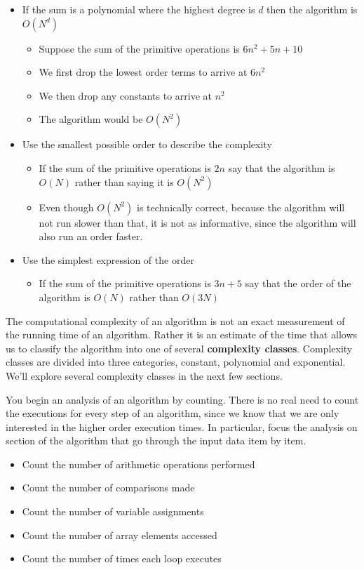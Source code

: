 \begin{itemize}
\item If the sum is a polynomial where the highest degree is $d$ then the algorithm is $O(N^d)$
\begin{itemize}
\item Suppose the sum of the primitive operations is $6n^2 + 5n + 10$
\item We first drop the lowest order terms to arrive at $6n^2$
\item We then drop any constants to arrive at $n^2$
\item The algorithm would be $O(N^2)$
\end{itemize}
\item Use the smallest possible order to describe the complexity
\begin{itemize}
\item If the sum of the primitive operations is $2n$  say that the algorithm is $O(N)$ rather than saying it is $O(N^2)$
\item Even though $O(N^2)$ is technically correct, because the algorithm will not run slower than that, it is not as informative, since the algorithm will also run an order faster.
\end{itemize}
\item Use the simplest expression of the order
\begin{itemize}
\item If the sum of the primitive operations is $3n+5$  say that the order of the algorithm is $O(N)$ rather than $O(3N)$
\end{itemize}

\end{itemize}

The computational complexity of an algorithm is not an exact measurement of the running time of an algorithm.   Rather it is an estimate of the time that allows us to classify the algorithm into one of several \textbf{complexity classes}.   Complexity classes are divided into three categories,  constant, polynomial and exponential.    We'll explore several complexity classes in the next few sections.

You begin an analysis of an algorithm by counting.   There is no real need to count the executions for every step of an algorithm, since we know that we are only interested in the higher order execution times.   In particular,  focus the analysis on section of the algorithm that go through the input data item by item.  

\begin {itemize}
\item Count the number of arithmetic operations performed
\item Count the number of comparisons made
\item Count the number of variable assignments
\item Count the number of array elements accessed 
\item Count the number of times each loop executes
\end{itemize}



